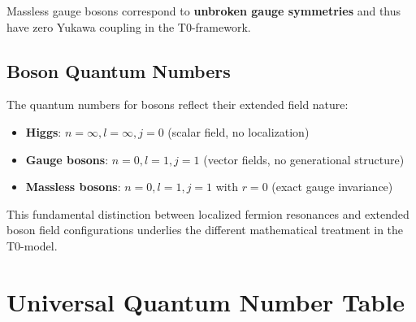 \documentclass[12pt,a4paper]{article}
\begin{document}
	Massless gauge bosons correspond to \textbf{unbroken gauge symmetries} and thus have zero Yukawa coupling in the T0-framework.
	
	\subsection{Boson Quantum Numbers}
	\label{subsec:boson_quantum_numbers}
	
	The quantum numbers for bosons reflect their extended field nature:
	
	\begin{itemize}
		\item \textbf{Higgs}: $n = \infty, l = \infty, j = 0$ (scalar field, no localization)
		\item \textbf{Gauge bosons}: $n = 0, l = 1, j = 1$ (vector fields, no generational structure)
		\item \textbf{Massless bosons}: $n = 0, l = 1, j = 1$ with $r = 0$ (exact gauge invariance)
	\end{itemize}
	
	This fundamental distinction between localized fermion resonances and extended boson field configurations underlies the different mathematical treatment in the T0-model.
	
	\section{Universal Quantum Number Table}
	\label{sec:universal_quantum_numbers}
	
\end{document}

